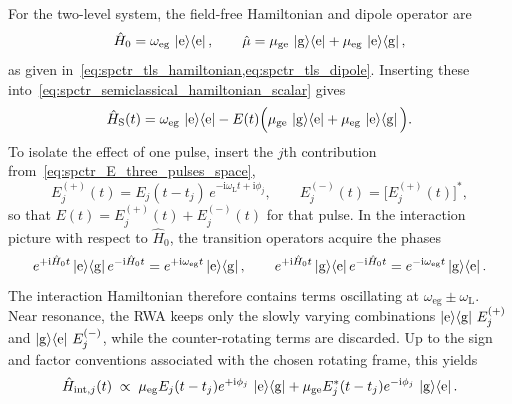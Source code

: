 For the two-level system, the field-free Hamiltonian and dipole operator are
\begin{equation*}
    \hat{H}_{0} = \omega_{\mathrm{eg}}\,\ket{\mathrm{e}}\!\bra{\mathrm{e}},
    \qquad
    \hat{\mu}
    = \mu_{\mathrm{ge}}\,\ket{\mathrm{g}}\!\bra{\mathrm{e}} + \mu_{\mathrm{eg}}\,\ket{\mathrm{e}}\!\bra{\mathrm{g}},
\end{equation*}
as given in~\autoref{eq:spctr_tls_hamiltonian,eq:spctr_tls_dipole}. Inserting these into~\autoref{eq:spctr_semiclassical_hamiltonian_scalar} gives
\begin{equation*}
    \hat{H}_{\mathrm{S}}(t)
    = \omega_{\mathrm{eg}}\,\ket{\mathrm{e}}\!\bra{\mathrm{e}}
    - E(t)\Big(\mu_{\mathrm{ge}}\,\ket{\mathrm{g}}\!\bra{\mathrm{e}} + \mu_{\mathrm{eg}}\,\ket{\mathrm{e}}\!\bra{\mathrm{g}}\Big).
\end{equation*}
To isolate the effect of one pulse, insert the $j$th contribution from~\autoref{eq:spctr_E_three_pulses_space},
\begin{equation*}
    E_j^{(+)}(t)
    = E_j(t-t_j)\,e^{-\mathrm{i}\omega_{\mathrm{L}} t + \mathrm{i}\phi_j},
    \qquad
    E_j^{(-)}(t)=\bigl[E_j^{(+)}(t)\bigr]^*,
\end{equation*}
so that $E(t)=E_j^{(+)}(t)+E_j^{(-)}(t)$ for that pulse. In the interaction picture with respect to $\hat{H}_{0}$, the transition operators acquire the phases
\begin{equation*}
    e^{+\mathrm{i}\hat{H}_0 t}\ket{\mathrm{e}}\!\bra{\mathrm{g}}e^{-\mathrm{i}\hat{H}_0 t}=e^{+\mathrm{i}\omega_{\mathrm{eg}}t}\ket{\mathrm{e}}\!\bra{\mathrm{g}},
    \qquad
    e^{+\mathrm{i}\hat{H}_0 t}\ket{\mathrm{g}}\!\bra{\mathrm{e}}e^{-\mathrm{i}\hat{H}_0 t}=e^{-\mathrm{i}\omega_{\mathrm{eg}}t}\ket{\mathrm{g}}\!\bra{\mathrm{e}}.
\end{equation*}
The interaction Hamiltonian therefore contains terms oscillating at $\omega_{\mathrm{eg}}\pm\omega_{\mathrm{L}}$. Near resonance, the RWA keeps only the slowly varying combinations $\ket{\mathrm{e}}\!\bra{\mathrm{g}}\,E_j^{(+)}$ and $\ket{\mathrm{g}}\!\bra{\mathrm{e}}\,E_j^{(-)}$, while the counter-rotating terms are discarded. Up to the sign and factor conventions associated with the chosen rotating frame, this yields
\begin{equation*}
    \hat{H}_{\mathrm{int},j}(t)
    \;\propto\;
    \mu_{\mathrm{eg}}E_j(t-t_j)e^{+\mathrm{i}\phi_j}\,\ket{\mathrm{e}}\!\bra{\mathrm{g}}
    + \mu_{\mathrm{ge}}E_j^*(t-t_j)e^{-\mathrm{i}\phi_j}\,\ket{\mathrm{g}}\!\bra{\mathrm{e}}.
\end{equation*}
